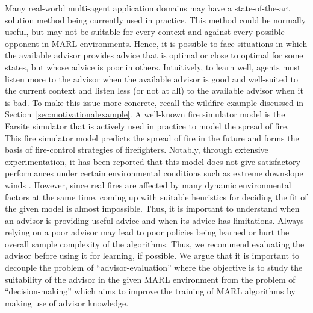 \documentclass[jair, twoside,11pt,theapa]{article}
\begin{document}
Many real-world multi-agent application domains may have a state-of-the-art solution method being currently used in practice. This method could be normally useful, but may not be suitable for every context and against every possible opponent in MARL environments. Hence, it is possible to face situations in which the available advisor  provides advice that is optimal or close to optimal for some states, but whose advice is poor in others.  Intuitively, to learn well, agents must listen more to the advisor when the available advisor is good and well-suited to the current context and listen less (or not at all) to the available advisor when it is bad. To make this issue more concrete, recall the 
 wildfire example discussed in Section~\ref{sec:motivationalexample}. A well-known fire simulator model is the Farsite \citep{finney1998farsite} simulator that is actively  used in practice to model the spread of fire. This fire simulator model predicts the spread of fire in the future and forms the basis of  fire-control strategies of firefighters. Notably, through extensive experimentation, it has been reported that this model does not give satisfactory performances under certain environmental conditions such as extreme downslope winds \citep{zigner2020evaluating}. However, since real fires are affected by many dynamic environmental factors at the same time, coming up with suitable heuristics for deciding the fit of the given model is almost impossible. Thus, it is important to understand when an advisor is providing useful advice and when its advice has limitations. Always relying on a poor advisor may lead to poor policies being learned or hurt the overall sample complexity of the algorithms. Thus, we recommend evaluating the advisor before using it for learning, if possible. We argue that it is important to  decouple the problem of ``advisor-evaluation'' where the objective is to study the suitability of the advisor in the given MARL environment from the problem of ``decision-making'' which aims to improve the training of MARL algorithms by making use of advisor knowledge.
 
\end{document}
